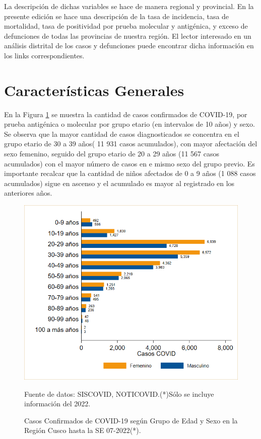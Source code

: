 \documentclass[12pt,a4paper,openany]{book}
\begin{document}
	La descripción de dichas variables se hace de manera regional y provincial. En la presente edición se hace una descripción de la tasa de incidencia, tasa de mortalidad, tasa de positividad por prueba molecular y antigénica, y exceso de defunciones de todas las provincias de nuestra región. El lector interesado en un análisis distrital de los casos y defunciones puede encontrar dicha información en los links correspondientes.
	 
	
	\clearpage	
	\section*{Características Generales}
	
	
	
 	\noindent En la Figura \ref{fig:casos_edad_sexo} se muestra la cantidad de casos confirmados de COVID-19, por prueba antigénica o molecular por grupo etario (en intervalos de 10 años) y sexo. Se observa que la mayor cantidad de casos diagnosticados se concentra en el grupo etario de 30 a 39 años( 11 931  casos acumulados), con mayor afectación del sexo femenino, seguido del grupo etario de 20 a 29 años (11 567 casos acumulados) con el mayor número de casos en e mismo sexo del grupo previo. Es importante recalcar que la cantidad de niños afectados de 0 a 9 años (1 088 casos acumulados) sigue en ascenso y el acumulado es mayor al registrado en los anteriores años.  
 	
 	
\begin{figure}[h]
	\caption{Casos Confirmados de COVID-19 según Grupo de Edad y Sexo en la Región Cusco hasta la SE 07-2022(*).}\label{fig:casos_edad_sexo}
	\begin{center}
		\includegraphics[width=0.75\linewidth]{../figuras/casos_etapavida_2022}
	\end{center}
	{\footnotesize {Fuente de datos: SISCOVID, NOTICOVID.(*)Sólo se incluye información del 2022.}}
\end{figure}
\pagebreak
\end{document}
